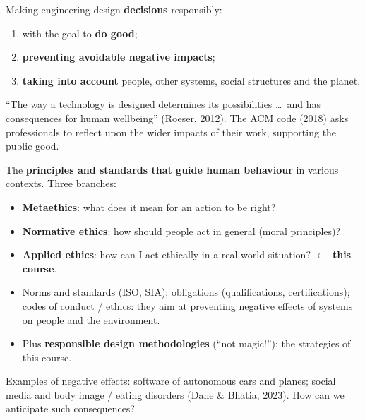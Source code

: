 \documentclass[11pt,a4paper,openany]{book}
\begin{document}
\begin{defnbox}[title={Responsible engineering}]
Making engineering design \textbf{decisions} responsibly:
\begin{enumerate}
  \item with the goal to \textbf{do good};
  \item \textbf{preventing avoidable negative impacts};
  \item \textbf{taking into account} people, other systems, social structures and the planet.
\end{enumerate}
``The way a technology is designed determines its possibilities \ldots\ and has consequences
for human wellbeing'' (Roeser, 2012). The ACM code (2018) asks professionals to reflect upon the
wider impacts of their work, supporting the public good.
\end{defnbox}

\begin{defnbox}[title={Ethics}]
The \textbf{principles and standards that guide human behaviour} in various contexts. Three
branches:
\begin{itemize}
  \item \textbf{Metaethics}: what does it mean for an action to be right?
  \item \textbf{Normative ethics}: how should people act in general (moral principles)?
  \item \textbf{Applied ethics}: how can I act ethically in a real-world situation?
        $\leftarrow$ \textbf{this course}.
\end{itemize}
\end{defnbox}

\begin{propbox}[title={How engineering organises responsibility}]
\begin{itemize}
  \item Norms and standards (ISO, SIA); obligations (qualifications, certifications); codes of
        conduct / ethics: they aim at preventing negative effects of systems on people and the
        environment.
  \item Plus \textbf{responsible design methodologies} (``not magic!''): the strategies of
        this course.
\end{itemize}
Examples of negative effects: software of autonomous cars and planes; social media and body
image / eating disorders (Dane \& Bhatia, 2023). How can we anticipate such consequences?
\end{propbox}
\end{document}
